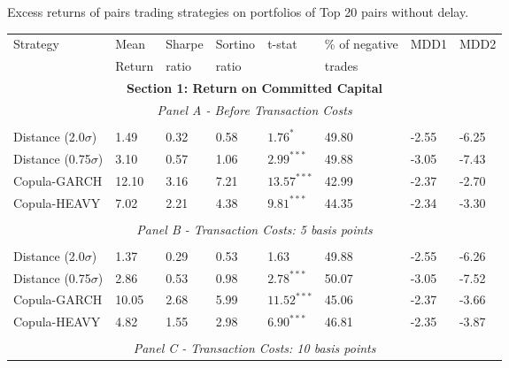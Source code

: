\documentclass[a4paper,12pt]{report}
\begin{document}
\begin{refsection}
\begin{threeparttable}[H]
	\centering \scriptsize \singlespacing
	\caption{Excess returns of pairs trading strategies on portfolios of Top 20 pairs without delay. }
	\begin{tabularx}{\textwidth}{@{\extracolsep{\fill}}llllllll@{}}
		\toprule
		Strategy & Mean  & Sharpe & Sortino & t-stat & \% of negative   & MDD1 & MDD2 \\
		& Return & ratio &  ratio     &  &  trades     &       &  \\
		\midrule
		\multicolumn{8}{c}{\textbf{Section 1: Return on Committed Capital}} \\
		\multicolumn{8}{c}{\textit{Panel A - Before Transaction Costs}} \\
		&       &       &       &       &       &       &  \\
		Distance (2.0$\sigma$) & 1.49 & 0.32 & 0.58 & $1.76^{*}$ & 49.80 & -2.55 & -6.25 \\
		Distance (0.75$\sigma$) & 3.10 & 0.57 & 1.06 & $2.99^{***}$ & 49.88 & -3.05 & -7.43 \\
		Copula-GARCH & 12.10 & 3.16 & 7.21 & $13.57^{***}$ & 42.99 & -2.37 & -2.70 \\
		Copula-HEAVY & 7.02 & 2.21 & 4.38 & $9.81^{***}$ & 44.35 & -2.34 & -3.30 \\
		\multicolumn{1}{r}{} & \multicolumn{1}{r}{} & \multicolumn{1}{r}{} & \multicolumn{1}{r}{} & \multicolumn{1}{r}{} & \multicolumn{1}{r}{} & \multicolumn{1}{r}{} & \multicolumn{1}{r}{} \\
		\multicolumn{8}{c}{\textit{Panel B - Transaction Costs: 5 basis points}} \\
		&       &       &       &       &       &       &  \\
		Distance (2.0$\sigma$) & 1.37  & 0.29  & 0.53  & 1.63  & 49.88 & -2.55  & -6.26 \\
		Distance (0.75$\sigma$) & 2.86  & 0.53  & 0.98  & $2.78^{***}$  & 50.07 & -3.05  & -7.52 \\
		Copula-GARCH & 10.05 & 2.68  & 5.99  & $11.52^{***}$ & 45.06 & -2.37  & -3.66 \\
		Copula-HEAVY & 4.82  & 1.55  & 2.98  & $6.90^{***}$  & 46.81 & -2.35  & -3.87 \\
		\multicolumn{1}{r}{} & \multicolumn{1}{r}{} & \multicolumn{1}{r}{} & \multicolumn{1}{r}{} & \multicolumn{1}{r}{} & \multicolumn{1}{r}{} & \multicolumn{1}{r}{} & \multicolumn{1}{r}{} \\
		\multicolumn{8}{c}{\textit{Panel C - Transaction Costs: 10 basis points}} \\

\end{tabularx}
\end{threeparttable}
\end{refsection}
\end{document}
